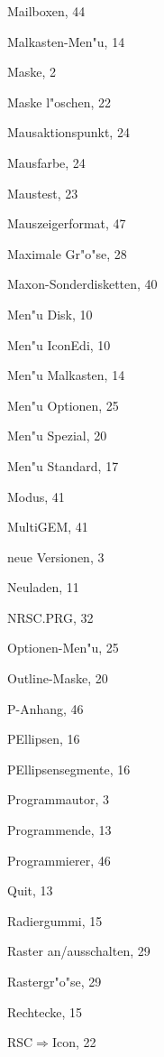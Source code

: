 \begin{theindex}
  \indexspace

  \item Mailboxen, 44
  \item Malkasten-Men"u, 14
  \item Maske, 2
  \item Maske l"oschen, 22
  \item Mausaktionspunkt, 24
  \item Mausfarbe, 24
  \item Maustest, 23
  \item Mauszeigerformat, 47
  \item Maximale Gr"o"se, 28
  \item Maxon-Sonderdisketten, 40
  \item Men"u Disk, 10
  \item Men"u IconEdi, 10
  \item Men"u Malkasten, 14
  \item Men"u Optionen, 25
  \item Men"u Spezial, 20
  \item Men"u Standard, 17
  \item Modus, 41
  \item MultiGEM, 41

  \indexspace

  \item neue Versionen, 3
  \item Neuladen, 11
  \item NRSC.PRG, 32

  \indexspace

  \item Optionen-Men"u, 25
  \item Outline-Maske, 20

  \indexspace

  \item P-Anhang, 46
  \item PEllipsen, 16
  \item PEllipsensegmente, 16
  \item Programmautor, 3
  \item Programmende, 13
  \item Programmierer, 46

  \indexspace

  \item Quit, 13

  \indexspace

  \item Radiergummi, 15
  \item Raster an/ausschalten, 29
  \item Rastergr"o"se, 29
  \item Rechtecke, 15
  \item RSC${\Rightarrow}$Icon, 22


\end{theindex}

